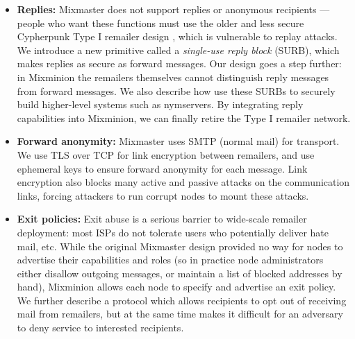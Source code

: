 \documentclass[11pt]{IEEEtran}
\begin{document}
\begin{itemize}
\item \textbf{Replies:} Mixmaster does not support replies or anonymous
recipients --- people who want these functions must use the older and less
secure Cypherpunk Type I remailer design \cite{remailer-history}, which is
vulnerable to replay attacks. We introduce a new primitive called a
\emph{single-use reply block} (SURB), which makes replies as secure as
forward messages. Our design goes a step further: in Mixminion the remailers
themselves cannot distinguish reply messages from forward messages. We also
describe how use these SURBs to securely build higher-level systems such as
nymservers. By integrating reply capabilities into Mixminion, we can finally
retire the Type I remailer network.

\item \textbf{Forward anonymity:} Mixmaster uses SMTP (normal mail) for
transport. We use TLS over TCP for link encryption between remailers,
and use ephemeral keys to ensure forward anonymity for
each message. Link encryption also blocks many active and
passive attacks on the communication links, forcing attackers to run
corrupt nodes to mount these attacks.


\item \textbf{Exit policies:} Exit abuse is a serious barrier to wide-scale
remailer deployment: most ISPs do not tolerate users who potentially
deliver hate mail, etc. While the original Mixmaster design provided no
way for nodes to advertise their capabilities and roles (so in practice node
administrators either disallow outgoing messages, or maintain a list of
blocked addresses by hand), 
Mixminion allows each node to specify and advertise an exit policy. We
further describe a protocol which allows recipients to opt out of receiving mail
from remailers, but at the same time makes it difficult for an adversary
to deny service to interested recipients.


\end{itemize}
\end{document}
